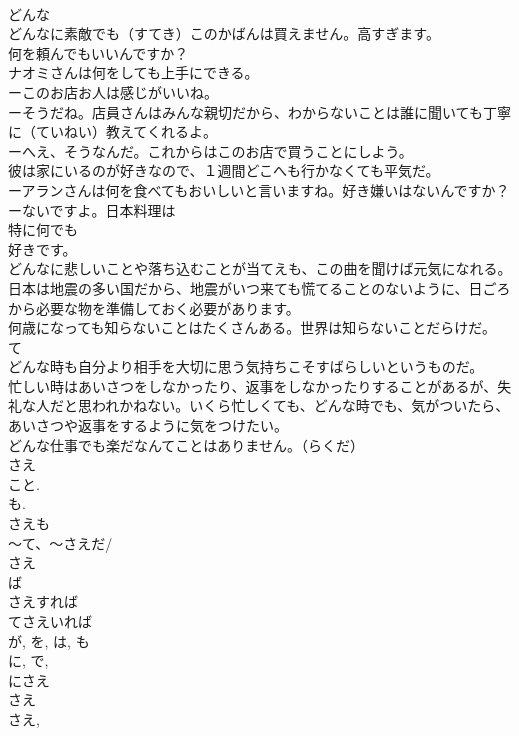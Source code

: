 \documentclass[8pt]{extreport}
\begin{document}
\begin{CJK}{UTF8}{min}
\\	どんな 
\\	どんなに素敵でも（すてき）このかばんは買えません。高すぎます。
\\	何を頼んでもいいんですか？
\\	ナオミさんは何をしても上手にできる。
\\	ーこのお店お人は感じがいいね。
\\	ーそうだね。店員さんはみんな親切だから、わからないことは誰に聞いても丁寧に（ていねい）教えてくれるよ。
\\	ーへえ、そうなんだ。これからはこのお店で買うことにしよう。
\\	彼は家にいるのが好きなので、１週間どこへも行かなくても平気だ。
\\	ーアランさんは何を食べてもおいしいと言いますね。好き嫌いはないんですか？
\\	ーないですよ。日本料理は
\\	特に何でも
\\	好きです。
\\	どんなに悲しいことや落ち込むことが当てえも、この曲を聞けば元気になれる。
\\	日本は地震の多い国だから、地震がいつ来ても慌てることのないように、日ごろから必要な物を準備しておく必要があります。
\\	何歳になっても知らないことはたくさんある。世界は知らないことだらけだ。
\\	て 
\\	どんな時も自分より相手を大切に思う気持ちこそすばらしいというものだ。
\\	忙しい時はあいさつをしなかったり、返事をしなかったりすることがあるが、失礼な人だと思われかねない。いくら忙しくても、どんな時でも、気がついたら、あいさつや返事をするように気をつけたい。
\\	どんな仕事でも楽だなんてことはありません。（らくだ）
\\	さえ
\\	こと.
\\	も. 
\\	さえも
\\	～て、～さえだ/
\\	さえ
\\	ば
\\	さえすれば
\\	てさえいれば
\\	が, を, は, も 
\\	に, で, 
\\	にさえ
\\	さえ 
\\	さえ, 

\end{CJK}
\end{document}
